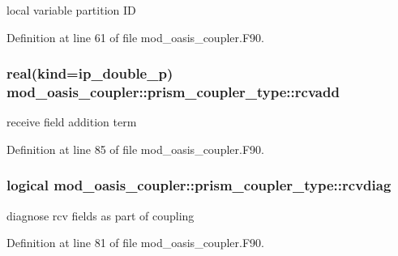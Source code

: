 local variable partition I\+D 



Definition at line 61 of file mod\+\_\+oasis\+\_\+coupler.\+F90.

\hypertarget{structmod__oasis__coupler_1_1prism__coupler__type_adee95ace457db5ccaacc0195f3327277}{
\subsubsection[{rcvadd}]{\setlength{\rightskip}{0pt plus 5cm}real(kind=ip\+\_\+double\+\_\+p) mod\+\_\+oasis\+\_\+coupler\+::prism\+\_\+coupler\+\_\+type\+::rcvadd\hspace{0.3cm}{\ttfamily [private]}}}\label{structmod__oasis__coupler_1_1prism__coupler__type_adee95ace457db5ccaacc0195f3327277}


receive field addition term 



Definition at line 85 of file mod\+\_\+oasis\+\_\+coupler.\+F90.

\hypertarget{structmod__oasis__coupler_1_1prism__coupler__type_a05d7a7317dd4b063ced94cebd4dfedc7}{
\subsubsection[{rcvdiag}]{\setlength{\rightskip}{0pt plus 5cm}logical mod\+\_\+oasis\+\_\+coupler\+::prism\+\_\+coupler\+\_\+type\+::rcvdiag\hspace{0.3cm}{\ttfamily [private]}}}\label{structmod__oasis__coupler_1_1prism__coupler__type_a05d7a7317dd4b063ced94cebd4dfedc7}


diagnose rcv fields as part of coupling 



Definition at line 81 of file mod\+\_\+oasis\+\_\+coupler.\+F90.

